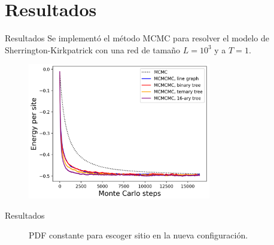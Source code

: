 \documentclass[xcolor=dvipsnames,presentation]{beamer}%
\newcommand{\shk}{Sherrington-Kirkpatrick}
\begin{document}
{
\AtBeginSection{}
\section{Resultados}
\begin{frame}{Resultados}
Se implementó el método MCMC para resolver el modelo de \shk{} con
una red de tamaño $L=10^3$ y a $T=1$.
\begin{figure}
\centering
\includegraphics[width=8cm]{resultados}
\end{figure}
\end{frame}

\begin{frame}{Resultados}
\begin{figure}
\centering
{}
\caption{PDF constante para escoger sitio en la nueva configuración.}
\end{figure}
\end{frame}
}
\end{document}
